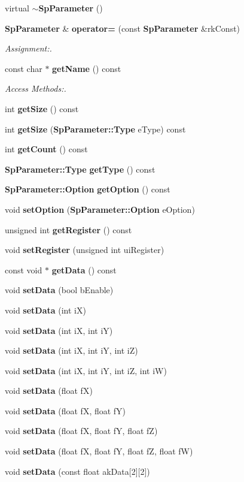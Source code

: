 \begin{CompactItemize}
\item 
virtual {\bf $\sim$Sp\-Parameter} ()
\item 
{\bf Sp\-Parameter} \& {\bf operator=} (const {\bf Sp\-Parameter} \&rk\-Const)
\begin{CompactList}\small\item\em Assignment:. \item\end{CompactList}\item 
const char $\ast$ {\bf get\-Name} () const
\begin{CompactList}\small\item\em Access Methods:. \item\end{CompactList}\item 
int {\bf get\-Size} () const
\item 
int {\bf get\-Size} ({\bf Sp\-Parameter::Type} e\-Type) const
\item 
int {\bf get\-Count} () const
\item 
{\bf Sp\-Parameter::Type} {\bf get\-Type} () const
\item 
{\bf Sp\-Parameter::Option} {\bf get\-Option} () const
\item 
void {\bf set\-Option} ({\bf Sp\-Parameter::Option} e\-Option)
\item 
unsigned int {\bf get\-Register} () const
\item 
void {\bf set\-Register} (unsigned int ui\-Register)
\item 
const void $\ast$ {\bf get\-Data} () const
\item 
void {\bf set\-Data} (bool b\-Enable)
\item 
void {\bf set\-Data} (int i\-X)
\item 
void {\bf set\-Data} (int i\-X, int i\-Y)
\item 
void {\bf set\-Data} (int i\-X, int i\-Y, int i\-Z)
\item 
void {\bf set\-Data} (int i\-X, int i\-Y, int i\-Z, int i\-W)
\item 
void {\bf set\-Data} (float f\-X)
\item 
void {\bf set\-Data} (float f\-X, float f\-Y)
\item 
void {\bf set\-Data} (float f\-X, float f\-Y, float f\-Z)
\item 
void {\bf set\-Data} (float f\-X, float f\-Y, float f\-Z, float f\-W)
\item 
void {\bf set\-Data} (const float ak\-Data[2][2])
\item 

\end{CompactItemize}

